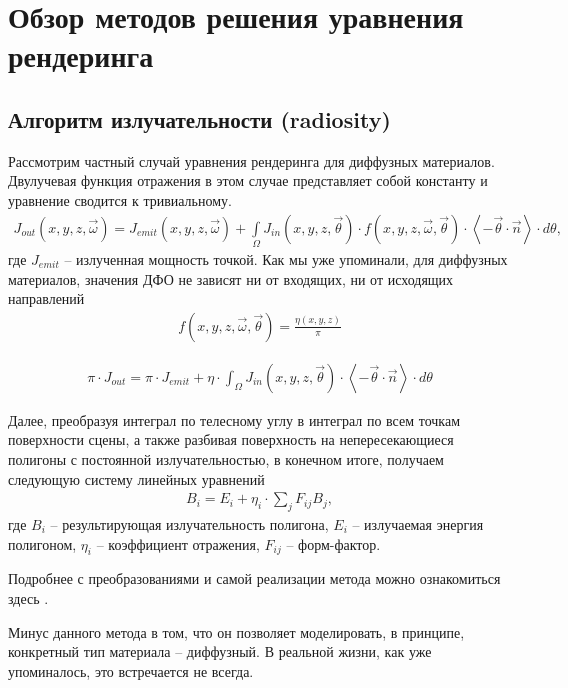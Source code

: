 \newpage
\section*{Обзор методов решения уравнения рендеринга} 

\subsection*{Алгоритм излучательности (radiosity)}
Рассмотрим частный случай уравнения рендеринга для диффузных материалов. Двулучевая функция отражения в этом случае представляет собой константу и уравнение сводится к тривиальному.
\begin{gather}
  J_{out}(x,y,z,\vec \omega) = J_{emit}(x,y,z,\vec \omega) + \int \limits_\Omega J_{in}(x,y,z,\vec \theta) \cdot f(x,y,z,\vec \omega,\vec \theta) \cdot \left\langle  {-\vec \theta \cdot \vec n} \right\rangle \cdot d\theta,
\end{gather}
где $J_{emit}$ -- излученная мощность точкой. Как мы уже упоминали, для диффузных материалов, значения ДФО не зависят ни от входящих, ни от исходящих направлений
\begin{gather}
  f(x,y,z,\vec \omega,\vec \theta) = \frac{\eta (x,y,z)}{\pi}
\end{gather}

\begin{gather}  
  \pi \cdot J_{out} = \pi \cdot J_{emit} + \eta \cdot \int_\Omega J_{in}(x,y,z,\vec \theta) \cdot \left\langle  {-\vec \theta \cdot \vec n} \right\rangle \cdot d\theta
\end{gather}

Далее, преобразуя интеграл по телесному углу в интеграл по всем точкам поверхности сцены, а также разбивая поверхность на непересекающиеся полигоны с постоянной излучательностью, в конечном итоге, получаем следующую систему линейных уравнений
\begin{gather}  
  B_i = E_i + \eta_i \cdot \sum_j F_{ij} B_j ,
\end{gather}
где $ B_i $ -- результирующая излучательность полигона, $ E_i $ -- излучаемая энергия полигоном, $ \eta_i $ -- коэффициент отражения, $ F_{ij} $ -- форм-фактор. 

Подробнее с преобразованиями и самой реализации метода можно ознакомиться здесь \cite{history}.

Минус данного метода в том, что он позволяет моделировать, в принципе, конкретный тип материала -- диффузный. В реальной жизни, как уже упоминалось, это встречается не всегда.

